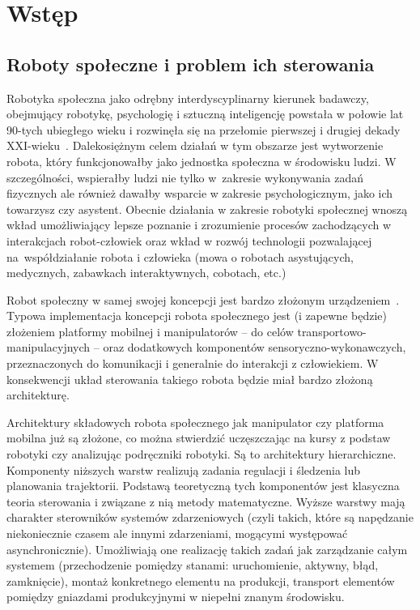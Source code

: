 {
\chapter{Wstęp}

\section{Roboty społeczne i problem ich sterowania}
\label{sec:rs}
Robotyka społeczna jako odrębny interdyscyplinarny kierunek badawczy, obejmujący robotykę, psychologię i sztuczną inteligencję powstała w połowie lat 90-tych ubiegłego wieku i rozwinęła się na przełomie pierwszej i drugiej dekady XXI-wieku~\cite{FONG}. Dalekosiężnym celem działań w tym obszarze jest wytworzenie robota, który funkcjonowałby jako jednostka społeczna w środowisku ludzi. W szczególności, wspierałby ludzi nie tylko w~zakresie wykonywania zadań fizycznych ale również dawałby wsparcie w zakresie psychologicznym, jako ich towarzysz czy asystent. Obecnie działania w zakresie robotyki społecznej wnoszą wkład umożliwiający lepsze poznanie i zrozumienie procesów zachodzących w interakcjach robot-człowiek oraz wkład w rozwój technologii pozwalającej na~współdziałanie robota i człowieka (mowa o robotach asystujących, medycznych, zabawkach interaktywnych, cobotach, etc.)

Robot społeczny w samej swojej koncepcji jest bardzo złożonym urządzeniem~\cite{AREN}. Typowa implementacja koncepcji robota społecznego jest (i zapewne będzie) złożeniem platformy mobilnej i manipulatorów -- do celów transportowo-manipulacyjnych -- oraz dodatkowych komponentów sensoryczno-wykonawczych, przeznaczonych do komunikacji i generalnie do interakcji z człowiekiem. W konsekwencji układ sterowania takiego robota będzie miał bardzo złożoną architekturę.

Architektury składowych robota społecznego jak manipulator czy platforma mobilna już są złożone, co można stwierdzić uczęszczając na kursy z podstaw robotyki czy analizując podręczniki robotyki. Są to architektury hierarchiczne. Komponenty niższych warstw realizują zadania regulacji i śledzenia lub planowania trajektorii. Podstawą teoretyczną tych komponentów jest klasyczna teoria sterowania i związane z nią metody matematyczne. Wyższe warstwy mają charakter sterowników systemów zdarzeniowych (czyli takich, które są napędzanie niekoniecznie czasem ale innymi zdarzeniami, mogącymi występować asynchronicznie). Umożliwiają one realizację takich zadań jak zarządzanie całym systemem (przechodzenie pomiędzy stanami: uruchomienie, aktywny, błąd, zamknięcie), montaż konkretnego elementu na produkcji, transport elementów pomiędzy gniazdami produkcyjnymi w niepełni znanym środowisku.

}

